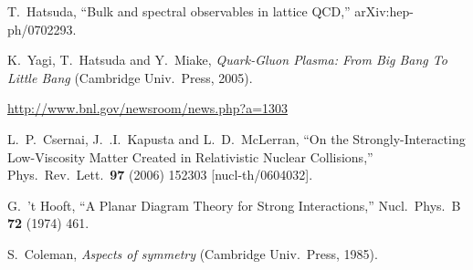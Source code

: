 \begin{thebibliography}{99}

%
%

  T.~Hatsuda,
  ``Bulk and spectral observables in lattice QCD,''
  arXiv:hep-ph/0702293.

  K.~Yagi, T.~Hatsuda and Y.~Miake,
  \textit{Quark-Gluon Plasma: From Big Bang To Little Bang}
  (Cambridge Univ.\ Press, 2005).

\url{http://www.bnl.gov/newsroom/news.php?a=1303}

  L.~P.~Csernai, J.~.I.~Kapusta and L.~D.~McLerran,
  ``On the Strongly-Interacting Low-Viscosity Matter Created in Relativistic Nuclear Collisions,''
  Phys.\ Rev.\ Lett.\  {\bf 97} (2006) 152303
  [nucl-th/0604032].
  
  G.~'t Hooft,
  ``A Planar Diagram Theory for Strong Interactions,''
  Nucl.\ Phys.\  B {\bf 72} (1974) 461.

S.~Coleman, 
\textit{Aspects of symmetry} 
(Cambridge Univ.\ Press, 1985).

\end{thebibliography}